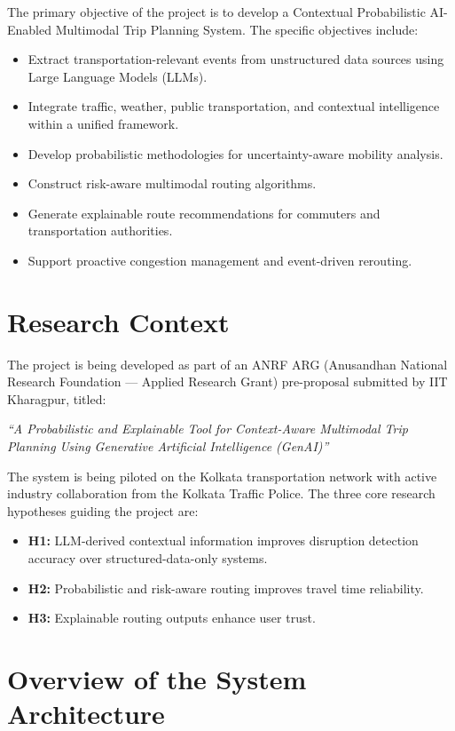 \documentclass[12pt, a4paper]{report}
\begin{document}
The primary objective of the project is to develop a Contextual Probabilistic AI-Enabled Multimodal Trip Planning System. The specific objectives include:

\begin{itemize}
    \item Extract transportation-relevant events from unstructured data sources using Large Language Models (LLMs).
    \item Integrate traffic, weather, public transportation, and contextual intelligence within a unified framework.
    \item Develop probabilistic methodologies for uncertainty-aware mobility analysis.
    \item Construct risk-aware multimodal routing algorithms.
    \item Generate explainable route recommendations for commuters and transportation authorities.
    \item Support proactive congestion management and event-driven rerouting.
\end{itemize}

\section{Research Context}

The project is being developed as part of an ANRF ARG (Anusandhan National Research Foundation — Applied Research Grant) pre-proposal submitted by IIT Kharagpur, titled:

\textit{``A Probabilistic and Explainable Tool for Context-Aware Multimodal Trip Planning Using Generative Artificial Intelligence (GenAI)''}

The system is being piloted on the Kolkata transportation network with active industry collaboration from the Kolkata Traffic Police. The three core research hypotheses guiding the project are:

\begin{itemize}
    \item \textbf{H1:} LLM-derived contextual information improves disruption detection accuracy over structured-data-only systems.
    \item \textbf{H2:} Probabilistic and risk-aware routing improves travel time reliability.
    \item \textbf{H3:} Explainable routing outputs enhance user trust.
\end{itemize}

\section{Overview of the System Architecture}
\end{document}
